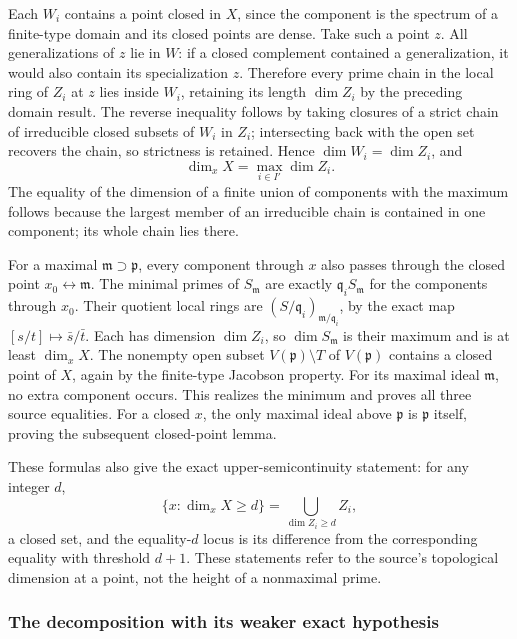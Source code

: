 Each \(W_i\) contains a point closed in \(X\), since the component is the spectrum of a finite-type domain and its closed points are dense. Take such a point \(z\). All generalizations of \(z\) lie in \(W\): if a closed complement contained a generalization, it would also contain its specialization \(z\). Therefore every prime chain in the local ring of \(Z_i\) at \(z\) lies inside \(W_i\), retaining its length \(\dim Z_i\) by the preceding domain result. The reverse inequality follows by taking closures of a strict chain of irreducible closed subsets of \(W_i\) in \(Z_i\); intersecting back with the open set recovers the chain, so strictness is retained. Hence \(\dim W_i=\dim Z_i\), and \[
 \dim_x X=\max_{i\in I'}\dim Z_i.
\] The equality of the dimension of a finite union of components with the maximum follows because the largest member of an irreducible chain is contained in one component; its whole chain lies there.

For a maximal \(\mathfrak m\supset\mathfrak p\), every component through \(x\) also passes through the closed point \(x_0\leftrightarrow\mathfrak m\). The minimal primes of \(S_{\mathfrak m}\) are exactly \(\mathfrak q_i S_{\mathfrak m}\) for the components through \(x_0\). Their quotient local rings are \((S/\mathfrak q_i)_{\mathfrak m/\mathfrak q_i}\), by the exact map \([s/t]\mapsto\bar s/\bar t\). Each has dimension \(\dim Z_i\), so \(\dim S_{\mathfrak m}\) is their maximum and is at least \(\dim_xX\). The nonempty open subset \(V(\mathfrak p)\setminus T\) of \(V(\mathfrak p)\) contains a closed point of \(X\), again by the finite-type Jacobson property. For its maximal ideal \(\mathfrak m\), no extra component occurs. This realizes the minimum and proves all three source equalities. For a closed \(x\), the only maximal ideal above \(\mathfrak p\) is \(\mathfrak p\) itself, proving the subsequent closed-point lemma.

These formulas also give the exact upper-semicontinuity statement: for any integer \(d\), \[
 \{x:\dim_xX\geq d\}=\bigcup_{\dim Z_i\geq d}Z_i,
\] a closed set, and the equality-\(d\) locus is its difference from the corresponding equality with threshold \(d+1\). These statements refer to the source's topological dimension at a point, not the height of a nonmaximal prime.

\subsubsection{The decomposition with its weaker exact hypothesis}\label{algebra-proof-025-the-decomposition-with-its-weaker-exact-hypothesis}

